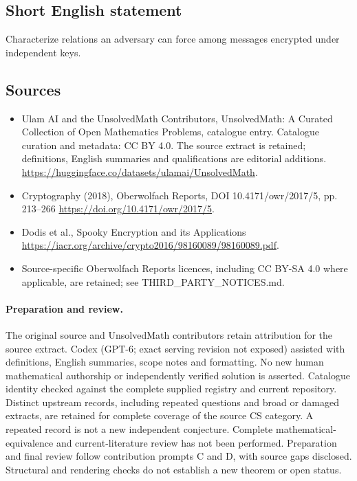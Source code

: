 \documentclass[11pt]{article}
\begin{document}
\subsection{Short English statement}
Characterize relations an adversary can force among messages encrypted under independent keys.
\subsection{Sources}
\begin{itemize}
\item[\hypertarget{source:statement:1}{S1}] Ulam AI and the UnsolvedMath Contributors, UnsolvedMath: A Curated Collection of Open Mathematics Problems, catalogue entry. Catalogue curation and metadata: CC BY 4.0. The source extract is retained; definitions, English summaries and qualifications are editorial additions.
\url{https://huggingface.co/datasets/ulamai/UnsolvedMath}.
\item[\hypertarget{source:statement:2}{S2}] Cryptography (2018), Oberwolfach Reports, DOI 10.4171/owr/2017/5, pp. 213--266
\url{https://doi.org/10.4171/owr/2017/5}.
\item[\hypertarget{source:statement:3}{S3}] Dodis et al., Spooky Encryption and its Applications
\url{https://iacr.org/archive/crypto2016/98160089/98160089.pdf}.
\item Source-specific Oberwolfach Reports licences, including CC BY-SA 4.0 where applicable, are retained; see THIRD\_PARTY\_NOTICES.md.
\end{itemize}
\paragraph{Preparation and review.}
The original source and UnsolvedMath contributors retain attribution for the source extract. Codex (GPT-6; exact serving revision not exposed) assisted with definitions, English summaries, scope notes and formatting. No new human mathematical authorship or independently verified solution is asserted. Catalogue identity checked against the complete supplied registry and current repository. Distinct upstream records, including repeated questions and broad or damaged extracts, are retained for complete coverage of the source CS category. A repeated record is not a new independent conjecture. Complete mathematical-equivalence and current-literature review has not been performed. Preparation and final review follow contribution prompts C and D, with source gaps disclosed. Structural and rendering checks do not establish a new theorem or open status.
\label{end:statement}
\end{document}

